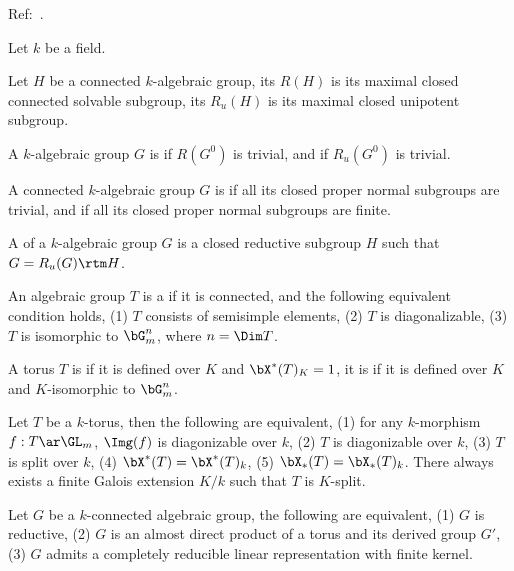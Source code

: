 \documentclass[a4paper, twoside]{article}
\begin{document}
\confighead{}{}{}


Ref:~\cite{BT1965}.


\begin{stp}
    Let $k$ be a field.
\end{stp}

\begin{dfn}[0.7, 0.8]
    Let $H$ be a connected $k$-algebraic group, its  $R(H)$ is its maximal closed connected solvable subgroup, its  $R_{u}(H)$ is its maximal closed unipotent subgroup.

    A $k$-algebraic group $G$ is  if $R(G^{0})$ is trivial, and  if $R_{u}(G^{0})$ is trivial.

    A connected $k$-algebraic group $G$ is  if all its closed proper normal subgroups are trivial, and  if all its closed proper normal subgroups are finite.


    A  of a $k$-algebraic group $G$ is a closed reductive subgroup $H$ such that $G=R_{u}(G)\rtm H$.
\end{dfn}

\begin{dfn}
    An algebraic group $T$ is a  if it is connected, and the following equivalent condition holds, (1) $T$ consists of semisimple elements, (2) $T$ is diagonalizable, (3) $T$ is isomorphic to $\bG_{m}^{n}$, where $n=\Dim T$.

    A torus $T$ is  if it is defined over $K$ and $\bX^{*}(T)_{K}=1$, it is  if it is defined over $K$ and $K$-isomorphic to $\bG_{m}^{n}$.
\end{dfn}

\begin{thm}[1.3, 1.5]
    Let $T$ be a $k$-torus, then the following are equivalent, (1) for any $k$-morphism $f:T\ar\GL_{m}$, $\Img(f)$ is diagonizable over $k$, (2) $T$ is diagonizable over $k$, (3) $T$ is split over $k$, (4) $\bX^{*}(T)=\bX^{*}(T)_{k}$, (5) $\bX_{*}(T)=\bX_{*}(T)_{k}$. There always exists a finite Galois extension $K/k$ such that $T$ is $K$-split.
\end{thm}


\begin{thm}[2.2]
    Let $G$ be a $k$-connected algebraic group, the following are equivalent, (1) $G$ is reductive, (2) $G$ is an almost direct product of a torus and its derived group $G'$, (3) $G$ admits a completely reducible linear representation with finite kernel.
\end{thm}



\printref
\end{document}

